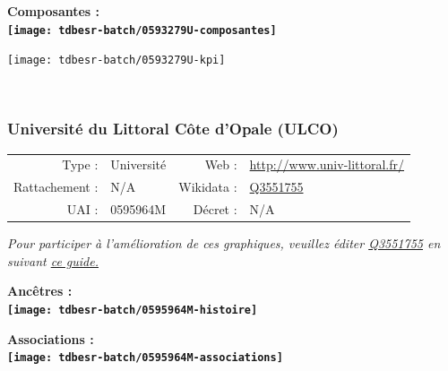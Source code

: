 \documentclass[12pt,french,]{article}
\begin{document}
\hrulefill

\begin{center} \bf Composantes : \\  
\texttt{[image: tdbesr-batch/0593279U-composantes]} \end{center}

\begin{center}\texttt{[image: tdbesr-batch/0593279U-kpi]} \end{center}\checkoddpage

\ifoddpage \fi ~\newpage  

\hypertarget{universituxe9-du-littoral-cuxf4te-dopale-ulco}{%
\subsubsection{Université du Littoral Côte d'Opale
(ULCO)}\label{universituxe9-du-littoral-cuxf4te-dopale-ulco}}

\begin{tabular*}{\textwidth}{rp{5cm}rl}  
\hline  
Type : & Université & Web : &\href{http://www.univ-littoral.fr/}{http://www.univ-littoral.fr/} \\  
Rattachement : & N/A & Wikidata : & \href{https://www.wikidata.org/entity/Q3551755}{Q3551755} \\  
UAI : & 0595964M & Décret : & N/A \\  
\hline  
\end{tabular*}

\textit{\scriptsize Pour participer à l'amélioration de ces graphiques, veuillez éditer  \href{https://www.wikidata.org/entity/Q3551755}{Q3551755}  en suivant \href{https://github.com/cpesr/wikidataESR/blob/master/Rmd/wikidataESR.md}{ce guide.}}

\vspace{1cm}  
\begin{minipage}[b]{0.50\textwidth}\begin{center} \bf Ancêtres : \\  
\texttt{[image: tdbesr-batch/0595964M-histoire]} \end{center}\end{minipage}\begin{minipage}[b]{0.50\textwidth}\begin{center} \bf Associations : \\  
\texttt{[image: tdbesr-batch/0595964M-associations]} \end{center}\end{minipage}
\end{document}
